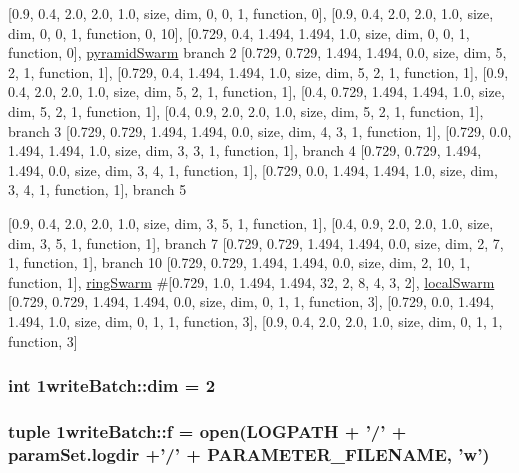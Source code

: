 \mbox{[}0.9, 0.4, 2.0, 2.0, 1.0, size, dim, 0, 0, 1, function, 0\mbox{]}, \mbox{[}0.9, 0.4, 2.0, 2.0, 1.0, size, dim, 0, 0, 1, function, 0, 10\mbox{]}, \mbox{[}0.729, 0.4, 1.494, 1.494, 1.0, size, dim, 0, 0, 1, function, 0\mbox{]}, \hyperlink{pso_8h_42bcedc2c7cf9459c9669f9df4f61ebd7534f884423a2349847018fa62c37966}{pyramidSwarm} branch 2 \mbox{[}0.729, 0.729, 1.494, 1.494, 0.0, size, dim, 5, 2, 1, function, 1\mbox{]}, \mbox{[}0.729, 0.4, 1.494, 1.494, 1.0, size, dim, 5, 2, 1, function, 1\mbox{]}, \mbox{[}0.9, 0.4, 2.0, 2.0, 1.0, size, dim, 5, 2, 1, function, 1\mbox{]}, \mbox{[}0.4, 0.729, 1.494, 1.494, 1.0, size, dim, 5, 2, 1, function, 1\mbox{]}, \mbox{[}0.4, 0.9, 2.0, 2.0, 1.0, size, dim, 5, 2, 1, function, 1\mbox{]}, branch 3 \mbox{[}0.729, 0.729, 1.494, 1.494, 0.0, size, dim, 4, 3, 1, function, 1\mbox{]}, \mbox{[}0.729, 0.0, 1.494, 1.494, 1.0, size, dim, 3, 3, 1, function, 1\mbox{]}, branch 4 \mbox{[}0.729, 0.729, 1.494, 1.494, 0.0, size, dim, 3, 4, 1, function, 1\mbox{]}, \mbox{[}0.729, 0.0, 1.494, 1.494, 1.0, size, dim, 3, 4, 1, function, 1\mbox{]}, branch 5 

\mbox{[}0.9, 0.4, 2.0, 2.0, 1.0, size, dim, 3, 5, 1, function, 1\mbox{]}, \mbox{[}0.4, 0.9, 2.0, 2.0, 1.0, size, dim, 3, 5, 1, function, 1\mbox{]}, branch 7 \mbox{[}0.729, 0.729, 1.494, 1.494, 0.0, size, dim, 2, 7, 1, function, 1\mbox{]}, branch 10 \mbox{[}0.729, 0.729, 1.494, 1.494, 0.0, size, dim, 2, 10, 1, function, 1\mbox{]}, \hyperlink{pso_8h_42bcedc2c7cf9459c9669f9df4f61ebdfc3a93f4de02d722a53d7981132ef07c}{ringSwarm} \#\mbox{[}0.729, 1.0, 1.494, 1.494, 32, 2, 8, 4, 3, 2\mbox{]}, \hyperlink{pso_8h_42bcedc2c7cf9459c9669f9df4f61ebd7ce49ac11e19dc0fa0dbd7b0e06a8264}{localSwarm} \mbox{[}0.729, 0.729, 1.494, 1.494, 0.0, size, dim, 0, 1, 1, function, 3\mbox{]}, \mbox{[}0.729, 0.0, 1.494, 1.494, 1.0, size, dim, 0, 1, 1, function, 3\mbox{]}, \mbox{[}0.9, 0.4, 2.0, 2.0, 1.0, size, dim, 0, 1, 1, function, 3\mbox{]} \hypertarget{namespace1writeBatch_46743721cf2ece6286597e3ccbc3f356}{
\subsubsection{\setlength{\rightskip}{0pt plus 5cm}int 1writeBatch::dim = 2}}
\label{namespace1writeBatch_46743721cf2ece6286597e3ccbc3f356}


\hypertarget{namespace1writeBatch_f4e8a81ebc8e5816186ac1dc5e643b73}{
\subsubsection{\setlength{\rightskip}{0pt plus 5cm}tuple 1writeBatch::f = open({\bf LOGPATH} + '/' + paramSet.logdir +'/' + {\bf PARAMETER\_\-FILENAME}, '{\bf w}')}}
\label{namespace1writeBatch_f4e8a81ebc8e5816186ac1dc5e643b73}


